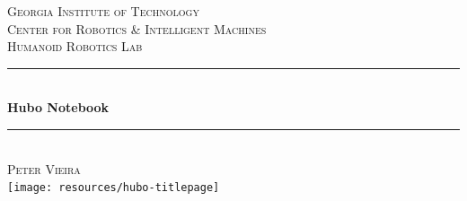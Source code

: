 \documentclass[letterpaper, 10 pt]{report}
\begin{document}
\begin{titlepage}
\center
\textsc{\LARGE Georgia Institute of Technology}\\[1.5cm]
\textsc{\large Center for Robotics \& Intelligent Machines}\\[0.5cm]
\textsc{\large Humanoid Robotics Lab}\\[0.5cm]
\rule{\linewidth}{0.5mm}\\[0.4cm]
{\huge \bfseries Hubo Notebook}\\[0.4cm]
\rule{\linewidth}{0.5mm}\\[1.5cm]
\textsc{\normalsize Peter Vieira}\\[1.5cm]
\texttt{[image: resources/hubo-titlepage]}
\vfill
\end{titlepage}

\end{document}
